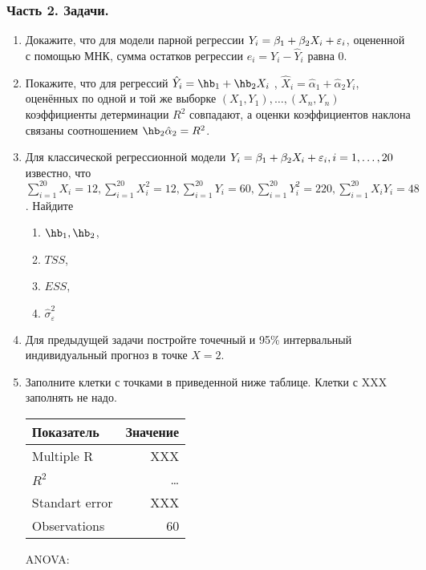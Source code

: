 \subsubsection*{Часть 2. Задачи.}

\begin{enumerate}

\item Докажите, что для модели парной регрессии  $Y_i = \beta_1 + \beta_2 X_i  + \varepsilon_i$, оцененной с помощью МНК, сумма остатков регрессии  $e_i=Y_i - \hat{Y}_i$ равна 0.

\item Покажите, что для регрессий $\hat{Y}_i= \hb_1 + \hb_2 X_i$ , $\hat{X}_i = \hat{\alpha}_1 + \hat{\alpha}_2 Y_i$, оценённых по одной и той же выборке $(X_1, Y_1),\ldots, (X_n, Y_n)$ коэффициенты детерминации $R^2$ совпадают, а оценки коэффициентов наклона связаны соотношением $\hb_2 \hat{\alpha}_2 = R^2$.

\item Для классической регрессионной модели $Y_i = \beta_1 + \beta_2 X_i + \varepsilon_i , i = 1,\ldots, 20$ известно, что $\sum_{i=1}^{20} X_i = 12, \sum_{i=1}^{20} X_i^2 = 12, \sum_{i=1}^{20} Y_i = 60, \sum_{i=1}^{20} Y_i^2 = 220, \sum_{i=1}^{20} X_i Y_i = 48$. Найдите
\begin{enumerate}
\item $\hb_1, \hb_2$,
\item $TSS$,
\item $ESS$,
\item $\hat\sigma^2_{\varepsilon}$
\end{enumerate}

\item Для предыдущей задачи постройте точечный и 95\% интервальный индивидуальный прогноз в точке $X = 2$.

\item Заполните клетки с точками в приведенной ниже таблице. Клетки с XXX заполнять не надо.

\begin{tabular}{lr} \toprule
Показатель & Значение \\
\midrule
Multiple R          & XXX \\
$R^2$     			& \ldots \\
Standart error 		& XXX \\
Observations		& 60 \\
\bottomrule
\end{tabular}

ANOVA:


\end{enumerate}
